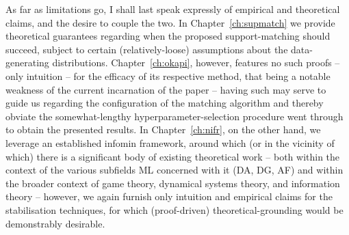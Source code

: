 %
%
As far as limitations go, I shall last speak expressly of empirical and theoretical claims, and the
desire to couple the two.
%
In Chapter~\ref{ch:supmatch} we provide theoretical guarantees regarding when the proposed
support-matching should succeed, subject to certain (relatively-loose) assumptions about the
data-generating distributions.
%
Chapter~\ref{ch:okapi}, however, features no such proofs -- only intuition -- for the efficacy of
its respective method, that being a notable weakness of the current incarnation of the paper --
having such may serve to guide us regarding the configuration of the matching algorithm and thereby
obviate the somewhat-lengthy hyperparameter-selection procedure went through to obtain the
presented results.
%
In Chapter~\ref{ch:nifr}, on the other hand, we leverage an established infomin framework, around
which (or in the vicinity of which) there is a significant body of existing theoretical work --
both within the context of the various subfields \ac{ML} concerned with it (\ac{DA}, \ac{DG},
\ac{AF}) and within the broader context of game theory, dynamical systems theory, and information
theory -- however, we again furnish only intuition and empirical claims for the stabilisation
techniques, for which (proof-driven) theoretical-grounding would be demonstrably desirable.

%
